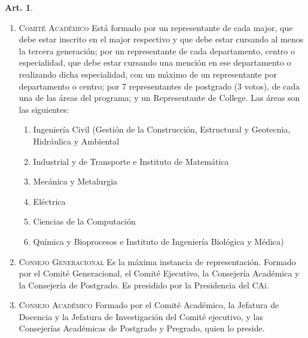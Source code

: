 \documentclass[letterpaper,11pt]{article}
\theoremstyle{definition}%
\newtheorem{art}{Art.} %
\begin{document}
\begin{art}
\begin{enumerate}
		\item \textsc{Comité Académico} Está formado por un representante de cada major, que debe estar inscrito en el major respectivo y que debe estar cursando al menos la tercera generación; por un representante de cada departamento, centro o especialidad, que debe estar cursando una mención en ese departamento o realizando dicha especialidad, con un máximo de un representante por departamento o centro; por 7 representantes de postgrado (3 votos), de cada una de las áreas del programa; y un Representante de College. Las áreas son las siguientes:
		      \begin{enumerate}
			      \item Ingeniería Civil (Gestión de la Construcción, Estructural y Geotecnia, Hidráulica y Ambiental
			      \item Industrial y de Transporte e Instituto de Matemática
			      \item Mecánica y Metalurgia
			      \item Eléctrica
			      \item Ciencias de la Computación
			      \item Química y Bioprocesos e Instituto de Ingeniería Biológica y Médica)
		      \end{enumerate}

		\item \textsc{Consejo Generacional} Es la máxima instancia de representación. Formado por el Comité Generacional, el Comité Ejecutivo, la Consejería Académica y la Consejería de Postgrado. Es presidido por la Presidencia del CAi.

		\item \textsc{Consejo Académico} Formado por el Comité Académico, la Jefatura de Docencia y la Jefatura de Investigación del Comité ejecutivo, y las Consejerías Académicas de Postgrado y Pregrado, quien lo preside.


\end{enumerate}
\end{art}
\end{document}
